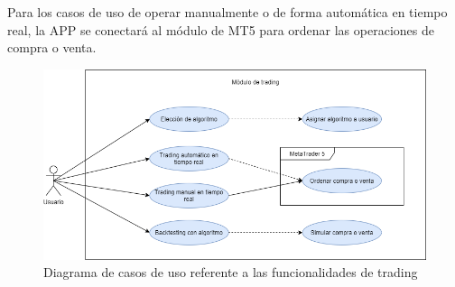 Para los casos de uso de operar manualmente o de forma automática en tiempo real, la APP se conectará al módulo de MT5 para ordenar las operaciones de compra o venta.


\begin{figure}[h] 
	\includegraphics[width=1\textwidth]{imagenes/diagramas_casos_de_uso/CU4-algoritmos.png} 
	\caption{Diagrama de casos de uso referente a las funcionalidades de trading} \label{cu4}
\end{figure}
